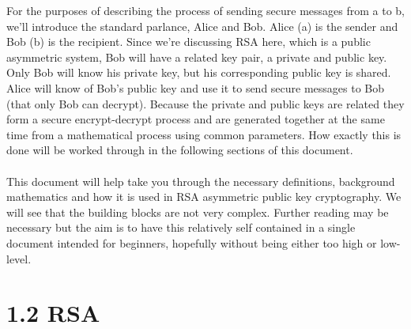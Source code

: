 \documentclass[11pt]{article}   	%
\begin{document}
For the purposes of describing the process of sending secure messages from a to b, we'll introduce the standard parlance, Alice and Bob. Alice (a) is the sender and Bob (b) is the recipient. Since we're discussing RSA here, which is a public asymmetric system, Bob will have a related key pair, a private and public key. Only Bob will know his private key, but his corresponding public key is shared. Alice will know of Bob's public key and use it to send secure messages to Bob (that only Bob can decrypt). Because the private and public keys are related they form a secure encrypt-decrypt process and are generated together at the same time from a mathematical process using common parameters. How exactly this is done will be worked through in the following sections of this document. \\
\\
This document will help take you through the necessary definitions, background mathematics and how it is used in RSA asymmetric public key cryptography. We will see that the building blocks are not very complex. Further reading may be necessary but the aim is to have this relatively self contained in a single document intended for beginners, hopefully without being either too high or low-level.


\section*{1.2 RSA}
\end{document}
